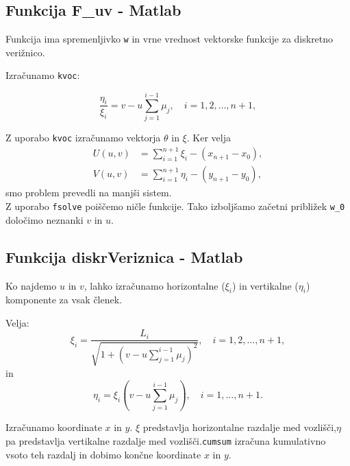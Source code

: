 \documentclass{article}
\begin{document}
    \subsection*{Funkcija F\_uv - Matlab} 
        Funkcija ima spremenljivko \texttt{w} in vrne vrednost vektorske funkcije za diskretno verižnico.
        
       Izračunamo \texttt{kvoc}:
        
        \begin{equation*}
            \frac{\eta_i}{\xi_i} = v - u \sum_{j=1}^{i-1} \mu_j, \quad i = 1, 2, \ldots, n + 1,
        \end{equation*}
        
        Z uporabo \texttt{kvoc} izračunamo vektorja \(\theta\) in \(\xi\). Ker velja
        \begin{align*}
            U(u, v) &= \sum_{i=1}^{n+1} \xi_i - (x_{n+1} - x_0), \\
            V(u, v) &= \sum_{i=1}^{n+1} \eta_i - (y_{n+1} - y_0),
        \end{align*}
        smo problem prevedli na manjši sistem. \\
        Z uporabo \texttt{fsolve} poiščemo ničle funkcije. Tako izboljšamo začetni približek \texttt{w\_0} določimo neznanki \(v\) in \(u\). 
        
    \subsection*{Funkcija diskrVeriznica - Matlab}
        Ko najdemo \( u \) in \( v \), lahko izračunamo horizontalne (\(\xi_i\)) in vertikalne (\(\eta_i\)) komponente za vsak členek.

        Velja: 
        \begin{equation*}
        \xi_i = \frac{L_i}{\sqrt{1 + \left( v - u \sum_{j=1}^{i-1} \mu_j \right)^2}}, \quad i = 1, 2, \ldots, n + 1,
        \end{equation*}
        in         
        \begin{equation*}
            \eta_i = \xi_i \left( v - u \sum_{j=1}^{i-1} \mu_j \right), \quad i = 1, \ldots, n + 1.
        \end{equation*}
    
        Izračunamo koordinate \(x\) in \(y\). \(\xi\) predstavlja horizontalne razdalje med vozlišči,\(\eta\) pa predstavlja vertikalne razdalje med vozlišči.\texttt{cumsum} izračuna kumulativno vsoto teh razdalj in dobimo končne koordinate \(x\) in \(y\).
        
\end{document}
